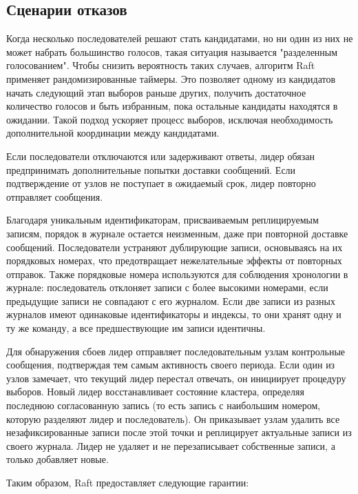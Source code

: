 \subsection{Сценарии отказов}

Когда несколько последователей решают стать кандидатами, но ни один из них не
может набрать большинство голосов, такая ситуация называется "разделенным
голосованием". Чтобы снизить вероятность таких случаев, алгоритм Raft применяет
рандомизированные таймеры. Это позволяет одному из кандидатов начать следующий
этап выборов раньше других, получить достаточное количество голосов и быть
избранным, пока остальные кандидаты находятся в ожидании. Такой подход ускоряет
процесс выборов, исключая необходимость дополнительной координации между кандидатами.

Если последователи отключаются или задерживают ответы, лидер обязан
предпринимать дополнительные попытки доставки сообщений. Если подтверждение от
узлов не поступает в ожидаемый срок, лидер повторно отправляет сообщения.

Благодаря уникальным идентификаторам, присваиваемым реплицируемым записям,
порядок в журнале остается неизменным, даже при повторной доставке сообщений.
Последователи устраняют дублирующие записи, основываясь на их порядковых номерах,
что предотвращает нежелательные эффекты от повторных отправок. Также порядковые
номера используются для соблюдения хронологии в журнале: последователь отклоняет
записи с более высокими номерами, если предыдущие записи не совпадают с
его журналом. Если две записи из разных журналов имеют одинаковые идентификаторы
и индексы, то они хранят одну и ту же команду, а все предшествующие им записи
идентичны.

Для обнаружения сбоев лидер отправляет последовательным узлам контрольные
сообщения, подтверждая тем самым активность своего периода. Если один из узлов
замечает, что текущий лидер перестал отвечать, он инициирует процедуру выборов.
Новый лидер восстанавливает состояние кластера, определяя последнюю согласованную
запись (то есть запись с наибольшим номером, которую разделяют лидер и последователь).
Он приказывает узлам удалить все незафиксированные записи после этой точки и
реплицирует актуальные записи из своего журнала. Лидер не удаляет и не
перезаписывает собственные записи, а только добавляет новые.

Таким образом, Raft предоставляет следующие гарантии:

